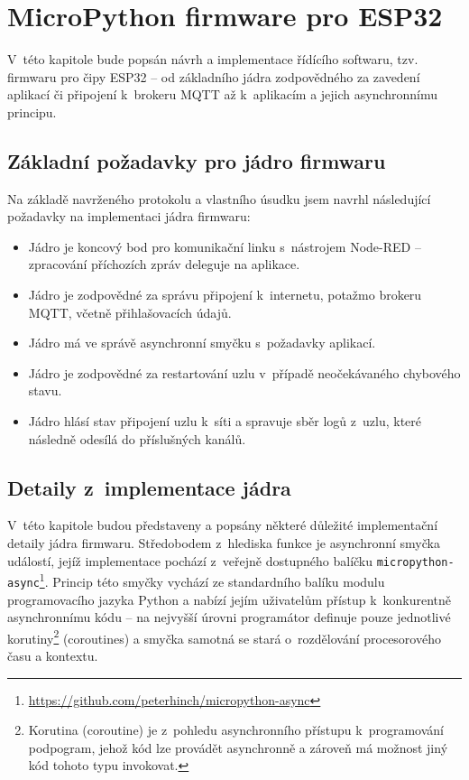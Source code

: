 \chapter{MicroPython firmware pro ESP32}
\label{ch:firmware}

V~této kapitole bude popsán návrh a implementace řídícího softwaru, tzv. firmwaru pro čipy ESP32 -- od základního
jádra zodpovědného za zavedení aplikací či připojení k~brokeru MQTT až k~aplikacím a jejich asynchronnímu principu.

\section{Základní požadavky pro jádro firmwaru}\label{sec:základní-požadavky-pro-jádro}
Na základě navrženého protokolu a vlastního úsudku jsem navrhl následující požadavky na implementaci jádra firmwaru:

\begin{itemize}
    \item Jádro je koncový bod pro komunikační linku s~nástrojem Node-RED -- zpracování příchozích zpráv deleguje na
    aplikace.
    \item Jádro je zodpovědné za správu připojení k~internetu, potažmo brokeru MQTT, včetně přihlašovacích údajů.
    \item Jádro má ve správě asynchronní smyčku s~požadavky aplikací.
    \item Jádro je zodpovědné za restartování uzlu v~případě neočekávaného chybového stavu.
    \item Jádro hlásí stav připojení uzlu k~síti a spravuje sběr logů z~uzlu, které následně odesílá do příslušných
    kanálů.
\end{itemize}

\section{Detaily z~implementace jádra}\label{sec:detaily-z-implementace-jadra}
V~této kapitole budou představeny a popsány některé důležité implementační detaily jádra firmwaru.
Středobodem z~hlediska funkce je asynchronní smyčka událostí, jejíž implementace pochází z~veřejně dostupného balíčku
\texttt{micropython-async}\footnote{\url{https://github.com/peterhinch/micropython-async}}.
Princip této smyčky vychází ze standardního balíku modulu  programovacího jazyka Python a nabízí
jejím uživatelům přístup k~konkurentně asynchronnímu kódu -- na nejvyšší úrovni programátor definuje pouze jednotlivé
korutiny\footnote{Korutina (coroutine) je z~pohledu asynchronního přístupu k~programování podpogram,
jehož kód lze provádět asynchronně a zároveň má možnost jiný kód tohoto typu invokovat.} (coroutines) a smyčka samotná
se stará o~rozdělování procesorového času a kontextu.

